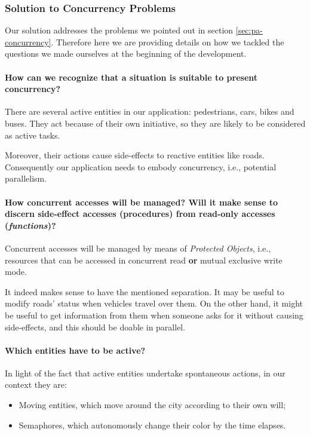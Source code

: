 
\subsubsection{Solution to Concurrency Problems}

Our solution addresses the problems we pointed out in section
\ref{sec:pa-concurrency}.
Therefore here we are providing details on how we tackled the questions we
made ourselves at the beginning of the development.

\paragraph{How can we recognize that a situation is suitable to present
concurrency?}
There are several active entities in our application: pedestrians, cars, bikes
and buses. They act because of their own initiative, so they are likely to be
considered as active tasks.

Moreover, their actions cause side-effects to reactive entities like roads.
Consequently our application needs to embody concurrency, i.e., potential
parallelism.

\paragraph{How concurrent accesses will be managed? Will it make sense to
discern side-effect accesses (procedures) from read-only accesses
(\textit{functions})?}
Concurrent accesses will be managed by means of \textit{Protected Objects},
i.e., resources that can be accessed in concurrent read \textbf{or} mutual
exclusive write mode.

It indeed makes sense to have the mentioned separation.
It may be useful to modify roads' status when vehicles travel over them.
On the other hand, it might be useful to get information from them when
someone asks for it without causing side-effects, and this should be doable in
parallel.

\paragraph{Which entities have to be active?}
In light of the fact that active entities undertake spontaneous actions, in
our context they are:
\begin{itemize}
  \item Moving entities, which move around the city according to their own
    will;
  \item Semaphores, which autonomously change their color by the time elapses.
\end{itemize}

